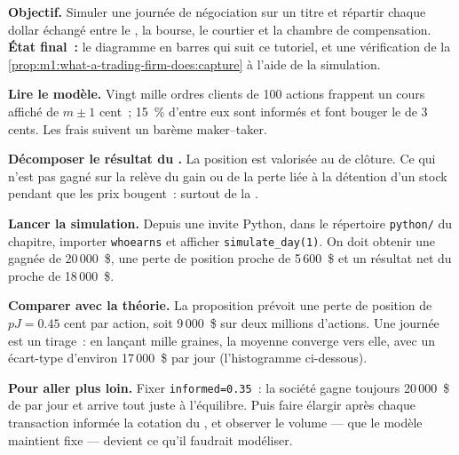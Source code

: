 \begin{tutorial}
\textbf{Objectif.} Simuler une journée de négociation sur un titre et répartir chaque
dollar échangé entre le , la bourse, le courtier
et la chambre de compensation. \textbf{État final~:} le diagramme en barres qui suit ce tutoriel,
et une vérification de
la \cref{prop:m1:what-a-trading-firm-does:capture} à l'aide de la simulation.
\begin{tutsteps}
\item \textbf{Lire le modèle.} Vingt mille ordres clients de 100 actions
frappent un cours affiché de $m \pm 1$ cent~; 15~\% d'entre eux sont informés et font bouger le  de
3 cents. Les frais suivent un barème maker--taker.
\label{lst:m1:what-a-trading-firm-does:loop}
\item \textbf{Décomposer le résultat du .} La position est valorisée au
 de clôture. Ce qui n'est pas gagné sur la  relève du gain ou de la perte
liée à la détention d'un stock pendant que les prix bougent~: surtout de la .
\label{lst:m1:what-a-trading-firm-does:split}
\item \textbf{Lancer la simulation.} Depuis une invite Python, dans le répertoire
\texttt{python/} du chapitre, importer \texttt{whoearns} et afficher
\texttt{simulate\_day(1)}. On doit obtenir une  gagnée de 20\,000~\$, une perte de position proche de 5\,600~\$
et un résultat net du  proche de 18\,000~\$.
\item \textbf{Comparer avec la théorie.} La proposition prévoit une perte de position
de $pJ = 0.45$ cent par action, soit 9\,000~\$ sur deux millions d'actions. Une journée est un
tirage~: en lançant mille graines, la moyenne converge vers elle, avec un écart-type
d'environ 17\,000~\$ par jour (l'histogramme ci-dessous).
\end{tutsteps}
\textbf{Pour aller plus loin.} Fixer \texttt{informed=0.35}~: la société
gagne toujours 20\,000~\$ de  par jour et arrive tout juste à l'équilibre. Puis faire
élargir après chaque transaction informée la cotation du , et observer le volume ---
que le modèle maintient fixe --- devient ce qu'il faudrait modéliser.
\end{tutorial}


